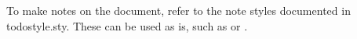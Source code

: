 To make notes on the document, refer to the note styles documented in todostyle.sty. These can be used as is, such as  or .
